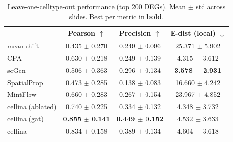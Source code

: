 \begin{table}
\caption{Leave-one-celltype-out performance (top 200 DEGs). Mean $\pm$ std across slides. Best per metric in \textbf{bold}.}
\label{tab:loo_summary_crc}
\begin{tabular}{lccc}
\toprule
 & Pearson $\uparrow$ & Precision $\uparrow$ & E-dist (local) $\downarrow$ \\
\midrule
mean shift & 0.435 $\pm$ 0.270 & 0.249 $\pm$ 0.096 & 25.371 $\pm$ 5.902 \\
CPA & 0.630 $\pm$ 0.218 & 0.249 $\pm$ 0.139 & 4.315 $\pm$ 3.612 \\
scGen & 0.506 $\pm$ 0.363 & 0.296 $\pm$ 0.134 & \textbf{3.578 $\pm$ 2.931} \\
SpatialProp & 0.473 $\pm$ 0.285 & 0.138 $\pm$ 0.083 & 16.660 $\pm$ 4.242 \\
MintFlow & 0.660 $\pm$ 0.283 & 0.267 $\pm$ 0.154 & 23.967 $\pm$ 4.852 \\
cellina (ablated) & 0.740 $\pm$ 0.225 & 0.334 $\pm$ 0.132 & 4.348 $\pm$ 3.732 \\
cellina (gat) & \textbf{0.855 $\pm$ 0.141} & \textbf{0.449 $\pm$ 0.152} & 4.532 $\pm$ 3.633 \\
cellina & 0.834 $\pm$ 0.158 & 0.389 $\pm$ 0.134 & 4.604 $\pm$ 3.618 \\
\bottomrule
\end{tabular}
\end{table}
